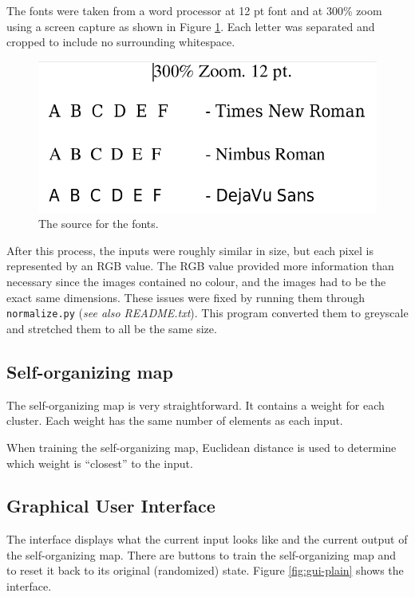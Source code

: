 \documentclass[12pt,letterpaper,oneside]{report}
\newcommand \code[1]{\texttt{#1}}
\newcommand \qq[1]{``{#1}''}
\begin{document}
The fonts were taken from a word processor at 12 pt font and at 300\% zoom using a screen capture as shown in Figure \ref{fig:font-screengrab}. Each letter was separated and cropped to include no surrounding whitespace.

\begin{figure}[ht]
  \centering
  \includegraphics[width=5in]{diagrams/font-screengrab}
  \caption{The source for the fonts.}
  \label{fig:font-screengrab}
\end{figure}

After this process, the inputs were roughly similar in size, but each pixel is
represented by an RGB value. The RGB value provided more information than
necessary since the images contained no colour, and the images had to be the
exact same dimensions. These issues were fixed by running them through
\code{normalize.py} (\textit{see also README.txt}). This program converted
them to greyscale and stretched them to all be the same size.


\subsection{Self-organizing map}
The self-organizing map is very straightforward. It contains a weight for each cluster. Each weight has the same number of elements as each input.

When training the self-organizing map, Euclidean distance is used to determine which weight is \qq{closest} to the input.


\subsection{Graphical User Interface}
The interface displays what the current input looks like and the current output of the self-organizing map. There are buttons to train the self-organizing map and to reset it back to its original (randomized) state. Figure \ref{fig:gui-plain} shows the interface.
\end{document}
